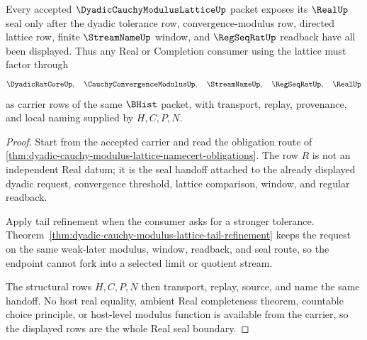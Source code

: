 \begin{theorem}
\label{thm:dyadic-cauchy-modulus-lattice-real-seal-handoff}
Every accepted $\DyadicCauchyModulusLatticeUp$ packet exposes its $\RealUp$ seal only after the dyadic tolerance row, convergence-modulus row, directed lattice row, finite $\StreamNameUp$ window, and $\RegSeqRatUp$ readback have all been displayed. Thus any Real or Completion consumer using the lattice must factor through
$$
\DyadicRatCoreUp,\quad
\CauchyConvergenceModulusUp,\quad
\StreamNameUp,\quad
\RegSeqRatUp,\quad
\RealUp
$$
as carrier rows of the same $\BHist$ packet, with transport, replay, provenance, and local naming supplied by $H,C,P,N$.
\end{theorem}
\begin{proof}
Start from the accepted carrier and read the obligation route of \autoref{thm:dyadic-cauchy-modulus-lattice-namecert-obligations}. The row $R$ is not an independent Real datum; it is the seal handoff attached to the already displayed dyadic request, convergence threshold, lattice comparison, window, and regular readback.

Apply tail refinement when the consumer asks for a stronger tolerance. Theorem~\ref{thm:dyadic-cauchy-modulus-lattice-tail-refinement} keeps the request on the same weak-later modulus, window, readback, and seal route, so the endpoint cannot fork into a selected limit or quotient stream.

The structural rows $H,C,P,N$ then transport, replay, source, and name the same handoff. No host real equality, ambient Real completeness theorem, countable choice principle, or host-level modulus function is available from the carrier, so the displayed rows are the whole Real seal boundary.
\end{proof}



